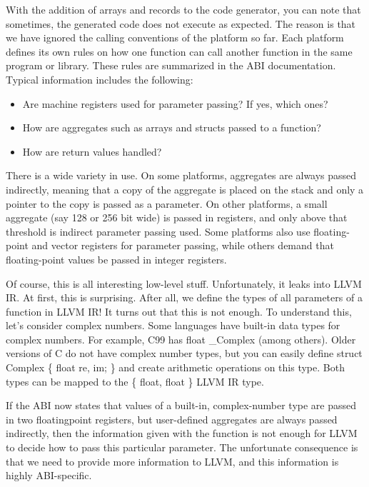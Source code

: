 With the addition of arrays and records to the code generator, you can note that sometimes, the generated code does not execute as expected. The reason is that we have ignored the calling conventions of the platform so far. Each platform defines its own rules on how one function can call another function in the same program or library. These rules are summarized in the ABI documentation. Typical information includes the following:

\begin{itemize}
\item
Are machine registers used for parameter passing? If yes, which ones?

\item
How are aggregates such as arrays and structs passed to a function?

\item
How are return values handled?
\end{itemize}

There is a wide variety in use. On some platforms, aggregates are always passed indirectly, meaning that a copy of the aggregate is placed on the stack and only a pointer to the copy is passed as a parameter. On other platforms, a small aggregate (say 128 or 256 bit wide) is passed in registers, and only above that threshold is indirect parameter passing used. Some platforms also use floating-point and vector registers for parameter passing, while others demand that floating-point values be passed in integer registers.

Of course, this is all interesting low-level stuff. Unfortunately, it leaks into LLVM IR. At first, this is surprising. After all, we define the types of all parameters of a function in LLVM IR! It turns out that this is not enough. To understand this, let’s consider complex numbers. Some languages have built-in data types for complex numbers. For example, C99 has float \_Complex (among others). Older versions of C do not have complex number types, but you can easily define struct Complex \{ float re, im; \} and create arithmetic operations on this type. Both types can be mapped to the \{ float, float \} LLVM IR type.

If the ABI now states that values of a built-in, complex-number type are passed in two floatingpoint registers, but user-defined aggregates are always passed indirectly, then the information given with the function is not enough for LLVM to decide how to pass this particular parameter. The unfortunate consequence is that we need to provide more information to LLVM, and this information is highly ABI-specific.

